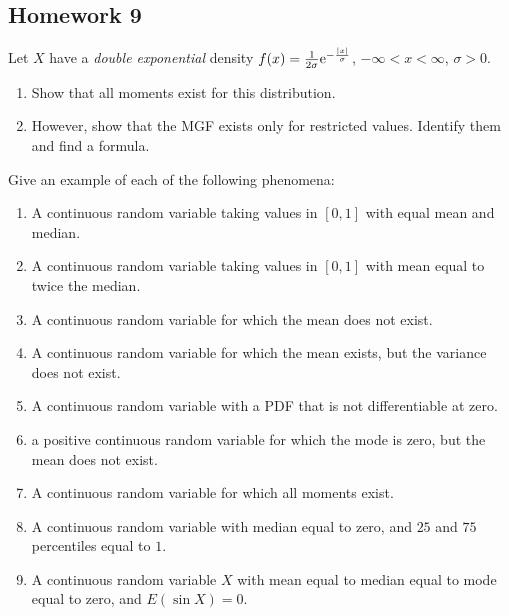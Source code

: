 \subsection{Homework 9}
\begin{problem}[Handout 13, \# 7]
  Let \(X\) have a \emph{double exponential} density
  \(f(x)=\frac{1}{2\sigma}\mathrm{e}^{-\frac{|x|}{\sigma}}\),
  \(-\infty<x<\infty\), \(\sigma>0\).
  \begin{enumerate}[label=(\alph*),noitemsep]
  \item Show that all moments exist for this distribution.
  \item However, show that the MGF exists only for restricted
    values. Identify them and find a formula.
  \end{enumerate}
\end{problem}
\begin{solution*}

\end{solution*}

\begin{problem}[Handout 13, \# 16]
  Give an example of each of the following phenomena:
  \begin{enumerate}[label=(\alph*),noitemsep]
  \item A continuous random variable taking values in \([0,1]\) with equal
    mean and median.
  \item A continuous random variable taking values in \([0,1]\) with mean
    equal to twice the median.
  \item A continuous random variable for which the mean does not exist.
  \item A continuous random variable for which the mean exists, but the
    variance does not exist.
  \item A continuous random variable with a PDF that is not differentiable
    at zero.
  \item a positive continuous random variable for which the mode is zero,
    but the mean does not exist.
  \item A continuous random variable for which all moments exist.
  \item A continuous random variable with median equal to zero, and
    \(25\) and \(75\) percentiles equal to \(1\).
  \item A continuous random variable \(X\) with mean equal to median equal
    to mode equal to zero, and \(E(\sin X)=0\).
  \end{enumerate}
\end{problem}
\begin{solution*}

\end{solution*}

